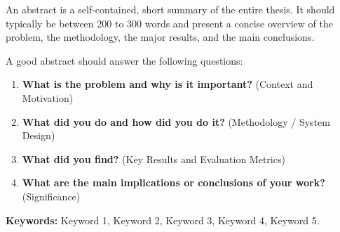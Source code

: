 \noindent
An abstract is a self-contained, short summary of the entire thesis. It should typically be between 200 to 300 words and present a concise overview of the problem, the methodology, the major results, and the main conclusions.

A good abstract should answer the following questions:
\begin{enumerate}
    \item \textbf{What is the problem and why is it important?} (Context and Motivation)
    \item \textbf{What did you do and how did you do it?} (Methodology / System Design)
    \item \textbf{What did you find?} (Key Results and Evaluation Metrics)
    \item \textbf{What are the main implications or conclusions of your work?} (Significance)
\end{enumerate}

\noindent
\textbf{Keywords:} Keyword 1, Keyword 2, Keyword 3, Keyword 4, Keyword 5.
